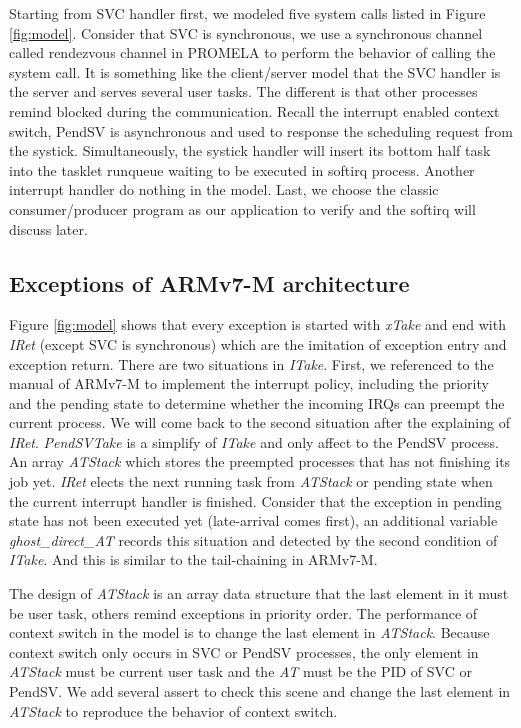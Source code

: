 Starting from SVC handler first, we modeled five system calls listed in Figure \ref{fig:model}. Consider that SVC is synchronous, we use a synchronous channel called rendezvous channel in PROMELA to perform the behavior of calling the system call. It is something like the client/server model that the SVC handler is the server and serves several user tasks. The different is that other processes remind blocked during the communication. Recall the interrupt enabled context switch, PendSV is asynchronous and used to response the scheduling request from the systick. Simultaneously, the systick handler will insert its bottom half task into the tasklet runqueue waiting to be executed in softirq process. Another interrupt handler do nothing in the model. Last, we choose the classic consumer/producer program as our application to verify and the softirq will discuss later.

\subsection{Exceptions of ARMv7-M architecture}
Figure \ref{fig:model} shows that every exception is started with \textit{xTake} and end with \textit{IRet} (except SVC is synchronous) which are the imitation of exception entry and exception return. There are two situations in \textit{ITake}. First, we referenced to the manual of ARMv7-M to implement the interrupt policy, including the priority and the pending state to determine whether the incoming IRQs can preempt the current process. We will come back to the second situation after the explaining of \textit{IRet}. \textit{PendSVTake} is a simplify of \textit{ITake} and only affect to the PendSV process. An array \textit{ATStack} which stores the preempted processes that has not finishing its job yet. \textit{IRet} elects the next running task from \textit{ATStack} or pending state when the current interrupt handler is finished. Consider that the exception in pending state has not been executed yet (late-arrival comes first), an additional variable \textit{ghost\_direct\_AT} records this situation and detected by the second condition of \textit{ITake}. And this is similar to the tail-chaining in ARMv7-M.

The design of \textit{ATStack} is an array data structure that the last element in it must be user task, others remind exceptions in priority order. The performance of context switch in the model is to change the last element in \textit{ATStack}. Because context switch only occurs in SVC or PendSV processes, the only element in \textit{ATStack} must be current user task and the \textit{AT} must be the PID of SVC or PendSV. We add several assert to check this scene and change the last element in \textit{ATStack} to reproduce the behavior of context switch.

